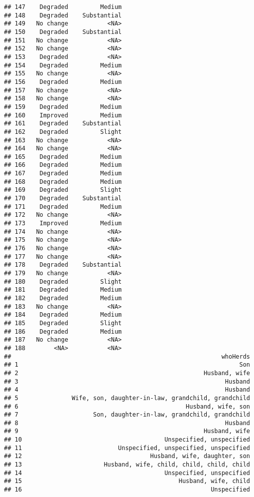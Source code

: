\documentclass[
]{article}
\begin{document}
\begin{verbatim}
## 147    Degraded         Medium
## 148    Degraded    Substantial
## 149   No change           <NA>
## 150    Degraded    Substantial
## 151   No change           <NA>
## 152   No change           <NA>
## 153    Degraded           <NA>
## 154    Degraded         Medium
## 155   No change           <NA>
## 156    Degraded         Medium
## 157   No change           <NA>
## 158   No change           <NA>
## 159    Degraded         Medium
## 160    Improved         Medium
## 161    Degraded    Substantial
## 162    Degraded         Slight
## 163   No change           <NA>
## 164   No change           <NA>
## 165    Degraded         Medium
## 166    Degraded         Medium
## 167    Degraded         Medium
## 168    Degraded         Medium
## 169    Degraded         Slight
## 170    Degraded    Substantial
## 171    Degraded         Medium
## 172   No change           <NA>
## 173    Improved         Medium
## 174   No change           <NA>
## 175   No change           <NA>
## 176   No change           <NA>
## 177   No change           <NA>
## 178    Degraded    Substantial
## 179   No change           <NA>
## 180    Degraded         Slight
## 181    Degraded         Medium
## 182    Degraded         Medium
## 183   No change           <NA>
## 184    Degraded         Medium
## 185    Degraded         Slight
## 186    Degraded         Medium
## 187   No change           <NA>
## 188        <NA>           <NA>
##                                                           whoHerds
## 1                                                              Son
## 2                                                    Husband, wife
## 3                                                          Husband
## 4                                                          Husband
## 5               Wife, son, daughter-in-law, grandchild, grandchild
## 6                                               Husband, wife, son
## 7                     Son, daughter-in-law, grandchild, grandchild
## 8                                                          Husband
## 9                                                    Husband, wife
## 10                                        Unspecified, unspecified
## 11                           Unspecified, unspecified, unspecified
## 12                                    Husband, wife, daughter, son
## 13                       Husband, wife, child, child, child, child
## 14                                        Unspecified, unspecified
## 15                                            Husband, wife, child
## 16                                                     Unspecified

\end{verbatim}
\end{document}
